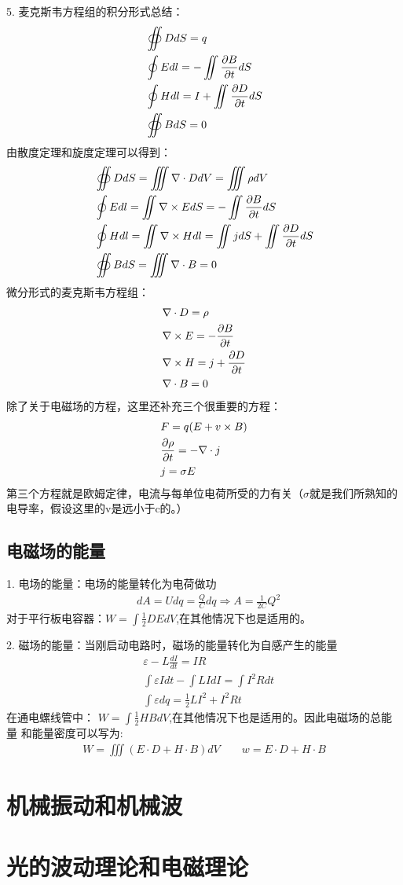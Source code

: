 \documentclass[UTF8]{article}
\numberwithin{equation}{section}
\begin{document}
5. 麦克斯韦方程组的积分形式总结：
\begin{align*}
    &\oiint D dS = q\\
    &\oint E dl = -\iint \pdv{B}{t} dS\\
    &\oint H dl = I+\iint \pdv{D}{t}dS\\
    &\oiint B dS = 0
\end{align*}
由散度定理和旋度定理可以得到：
\begin{align*}
    &\oiint D dS = \iiint \nabla\cdot D dV = \iiint \rho dV\\
    &\oint E dl =\iint \nabla \times E dS= -\iint \pdv{B}{t} dS\\
    &\oint H dl = \iint \nabla \times H dl =\iint j dS+\iint \pdv{D}{t}dS\\
    &\oiint B dS =\iiint \nabla \cdot B =0
\end{align*}
微分形式的麦克斯韦方程组：
\begin{align*}
    &\nabla\cdot D  =  \rho \\
    &\nabla \times E =  -\pdv{B}{t} \\
    &\nabla \times H  = j + \pdv{D}{t}\\
    &\nabla \cdot B =0
\end{align*}
除了关于电磁场的方程，这里还补充三个很重要的方程：
\begin{align*}
    &F=q(E+v\times B)\\
    &\pdv{\rho}{t}=-\nabla \cdot j\\
    &j=\sigma E
\end{align*}
第三个方程就是欧姆定律，电流与每单位电荷所受的力有关（$\sigma$就是我们所熟知的电导率，假设这里的v是远小于c的。）
\subsection{电磁场的能量}
1. 电场的能量：电场的能量转化为电荷做功
\begin{align*}
    &dA=Udq=\frac{Q}{C}dq\Rightarrow A=\frac{1}{2C}Q^2
\end{align*}
对于平行板电容器：$W=\int \frac{1 }{2}DEdV$,在其他情况下也是适用的。

2. 磁场的能量：当刚启动电路时，磁场的能量转化为自感产生的能量
\begin{align*}
    &\varepsilon-L\frac{dI}{dt}=IR\\
    &\int \varepsilon Idt -\int LIdI=\int I^2R dt\\
    &\int \varepsilon dq=\frac{1}{2}LI^2+I^2Rt
\end{align*}
在通电螺线管中： $W=\int \frac{1}{2}HBdV$,在其他情况下也是适用的。因此电磁场的总能量
和能量密度可以写为:
\begin{align*}
    W= \iiint(E\cdot D +H\cdot B)  dV\qquad w= E\cdot D+H\cdot B
\end{align*}


\section{机械振动和机械波}
\section{光的波动理论和电磁理论}
\end{document}

